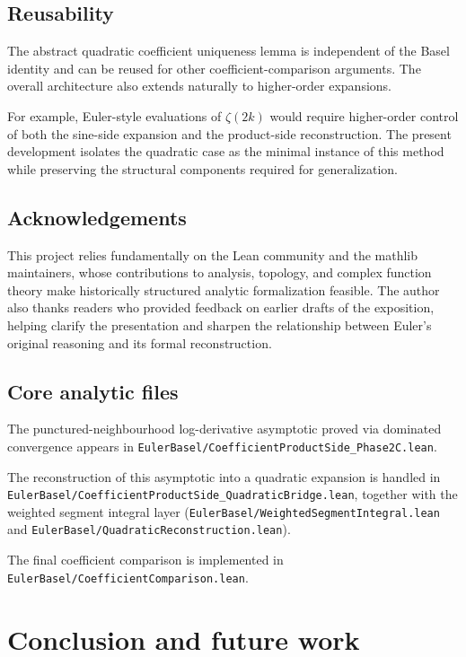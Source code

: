 \documentclass[11pt,a4paper]{article}
\theoremstyle{plain}
\theoremstyle{definition}
\DeclareRobustCommand{\codepath}[1]{\nolinkurl{#1}}
\DeclareRobustCommand{\codepath}[1]{\nolinkurl{#1}}
\begin{document}
\subsection{Reusability}

The abstract quadratic coefficient uniqueness lemma is independent of the Basel identity and can be reused for other coefficient-comparison arguments. The overall architecture also extends naturally to higher-order expansions.

For example, Euler-style evaluations of \(\zeta(2k)\) would require higher-order control of both the sine-side expansion and the product-side reconstruction. The present development isolates the quadratic case as the minimal instance of this method while preserving the structural components required for generalization.

\subsection{Acknowledgements}

This project relies fundamentally on the Lean community and the mathlib maintainers, whose contributions to analysis, topology, and complex function theory make historically structured analytic formalization feasible. The author also thanks readers who provided feedback on earlier drafts of the exposition, helping clarify the presentation and sharpen the relationship between Euler’s original reasoning and its formal reconstruction.

\subsection{Core analytic files}

The punctured-neighbourhood log-derivative asymptotic proved via dominated convergence appears in
\codepath{EulerBasel/CoefficientProductSide_Phase2C.lean}.  

The reconstruction of this asymptotic into a quadratic expansion is handled in
\codepath{EulerBasel/CoefficientProductSide_QuadraticBridge.lean},
together with the weighted segment integral layer
(\codepath{EulerBasel/WeightedSegmentIntegral.lean} and
\codepath{EulerBasel/QuadraticReconstruction.lean}).  

The final coefficient comparison is implemented in
\codepath{EulerBasel/CoefficientComparison.lean}.

\section{Conclusion and future work}
\end{document}
